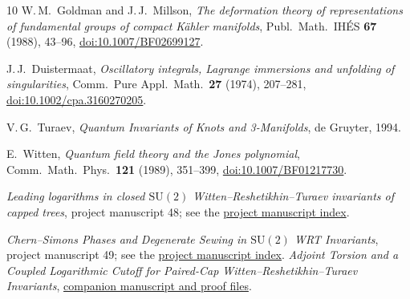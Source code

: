 \documentclass[11pt]{article}
\theoremstyle{remark}
\newcommand{\SU}{\mathrm{SU}(2)}
\begin{document}
\begin{thebibliography}{10}
W.\,M.~Goldman and J.\,J.~Millson,
\emph{The deformation theory of representations of fundamental groups of compact K\"ahler manifolds},
Publ.\ Math.\ IH\'ES \textbf{67} (1988), 43--96,
\href{https://doi.org/10.1007/BF02699127}{doi:10.1007/BF02699127}.

J.\,J.~Duistermaat,
\emph{Oscillatory integrals, Lagrange immersions and unfolding of singularities},
Comm.\ Pure Appl.\ Math.\ \textbf{27} (1974), 207--281,
\href{https://doi.org/10.1002/cpa.3160270205}{doi:10.1002/cpa.3160270205}.

V.\,G.~Turaev,
\emph{Quantum Invariants of Knots and 3-Manifolds}, de Gruyter, 1994.

E.~Witten,
\emph{Quantum field theory and the Jones polynomial},
Comm.\ Math.\ Phys.\ \textbf{121} (1989), 351--399,
\href{https://doi.org/10.1007/BF01217730}{doi:10.1007/BF01217730}.

\emph{Leading logarithms in closed \(\SU\) Witten--Reshetikhin--Turaev invariants of capped trees},
project manuscript 48; see the
\href{https://github.com/g3173028019-beep/ai-automated-quantum-gravity-research/blob/main/docs/PAPER-INDEX.md}{project manuscript index}.

\emph{Chern--Simons Phases and Degenerate Sewing in \(\SU\) WRT Invariants},
project manuscript 49; see the
\href{https://github.com/g3173028019-beep/ai-automated-quantum-gravity-research/blob/main/docs/PAPER-INDEX.md}{project manuscript index}.
\emph{Adjoint Torsion and a Coupled Logarithmic Cutoff for Paired-Cap Witten--Reshetikhin--Turaev Invariants},
\href{https://github.com/g3173028019-beep/ai-automated-quantum-gravity-research/tree/main/papers/48-49-wrt-torsion-bridge}{companion manuscript and proof files}.
\end{thebibliography}
\end{document}
